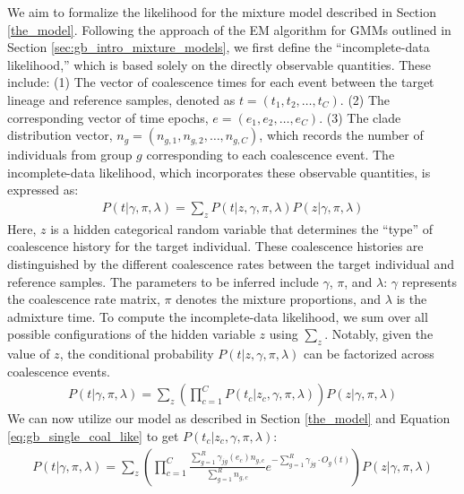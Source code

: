 We aim to formalize the likelihood for the mixture model described in Section \ref{the_model}. Following the approach of the EM algorithm for GMMs outlined in Section \ref{sec:gb_intro_mixture_models}, we first define the ``incomplete-data likelihood,'' which is based solely on the directly observable quantities. These include: (1) The vector of coalescence times for each event between the target lineage and reference samples, denoted as \( t = (t_1, t_2, \ldots, t_C) \). (2) The corresponding vector of time epochs, \( e = (e_1, e_2, \ldots, e_C) \). (3) The clade distribution vector, \( n_g = (n_{g,1}, n_{g,2}, \ldots, n_{g,C}) \), which records the number of individuals from group \( g \) corresponding to each coalescence event. The incomplete-data likelihood, which incorporates these observable quantities, is expressed as:
\begin{align}
    P(t \vert \gamma, \pi, \lambda) = \sum_{z} P(t \vert z, \gamma, \pi, \lambda) P(z \vert \gamma, \pi, \lambda) 
\end{align}
Here, \( z \) is a hidden categorical random variable that determines the ``type'' of coalescence history for the target individual. These coalescence histories are distinguished by the different coalescence rates between the target individual and reference samples. The parameters to be inferred include \( \gamma \), \( \pi \), and \( \lambda \): \( \gamma \) represents the coalescence rate matrix, \( \pi \) denotes the mixture proportions, and \( \lambda \) is the admixture time. To compute the incomplete-data likelihood, we sum over all possible configurations of the hidden variable \( z \) using $\sum_{z}$. Notably, given the value of \( z \), the conditional probability \( P(t \vert z, \gamma, \pi, \lambda) \) can be factorized across coalescence events.
\begin{align}
    P(t \vert \gamma, \pi, \lambda) = \sum_{z} \left( \prod_{c=1}^C P(t_c \vert z_c, \gamma, \pi, \lambda) \right) P(z \vert \gamma, \pi, \lambda) 
\end{align}
We can now utilize our model as described in Section \ref{the_model} and Equation \ref{eq:gb_single_coal_like} to get $P(t_c \vert z_c,\gamma, \pi, \lambda)$:
\begin{align}
    P(t \vert \gamma, \pi, \lambda) = \sum_{z} \left( \prod_{c=1}^C \frac{\sum_{g=1}^R \gamma_{jg}(e_c) n_{g,c}}{\sum_{g=1}^R n_{g,c}} e^{-\sum_{g=1}^R \gamma_{jg} \cdot O_{g} (t)} \right) P(z \vert \gamma, \pi, \lambda) 
\label{eq:gb_incomplete_data_likelihood}
\end{align}

